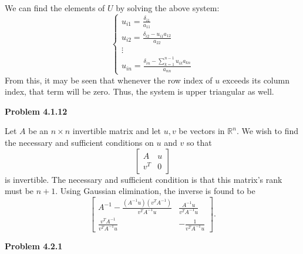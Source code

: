 \documentclass{article}
\def\R{\mathbb{R}}
\newcommand{\Problem}[1]{\textbf{Problem #1}}
\begin{document}
We can find the elements of $U$ by solving the above system:
\begin{equation*}
\begin{cases}
	u_{i1} = \frac{\delta_{i1}}{a_{11}}\\
	u_{i2} = \frac{\delta_{i2} - u_{i1}a_{12}}{a_{22}}\\
	\vdots\\
	u_{in} = \frac{\delta_{in} - \sum_{k=1}^{n-1}u_{ik}a_{kn}}{a_{nn}}
\end{cases}	
\end{equation*}
From this, it may be seen that whenever the row index of $u$ exceeds its column index, that term will be zero. Thus, the system is upper triangular as well. 

\Problem{4.1.12}

Let $A$ be an $n \times n$ invertible matrix and let $u,v$ be vectors in $\R^n$. We wish to find the necessary and sufficient conditions on $u$ and $v$ so that 
\begin{equation*}
\begin{bmatrix}
A & u\\
v^{T} & 0	
\end{bmatrix}
\end{equation*}
is invertible. The necessary and sufficient condition is that this matrix's rank must be $n+1$. Using Gaussian elimination, the inverse is found to be 
\begin{equation*}
\begin{bmatrix}
	A^{-1}-\frac{(A^{-1}u)(v^TA^{-1})}{v^TA^{-1}u} & \frac{A^{-1}u}{v^TA^{-1}u}\\
	\frac{v^TA^{-1}}{v^TA^{-1}u} & -\frac{1}{v^TA^{-1}u}
\end{bmatrix}.
\end{equation*}


\Problem{4.2.1}
\end{document}
